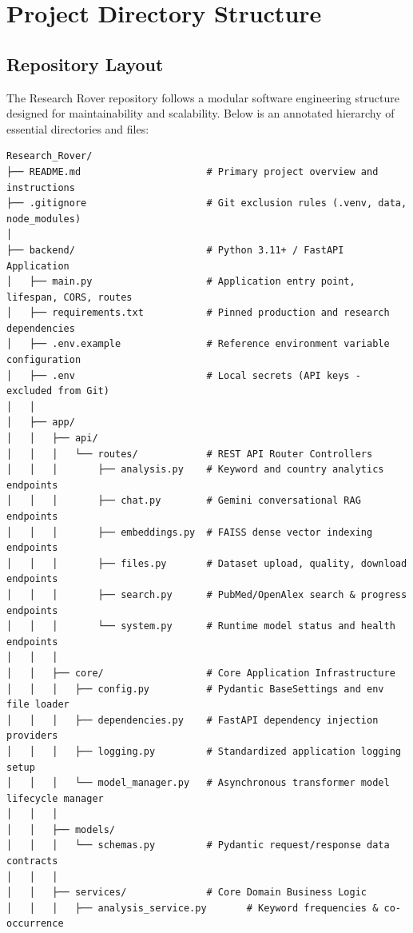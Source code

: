 \section{Project Directory Structure}
\label{sec:directory_structure}

\subsection{Repository Layout}
The Research Rover repository follows a modular software engineering structure designed for maintainability and scalability. Below is an annotated hierarchy of essential directories and files:

\begin{lstlisting}[caption={Annotated Research Rover Project Tree}]
Research_Rover/
├── README.md                      # Primary project overview and instructions
├── .gitignore                     # Git exclusion rules (.venv, data, node_modules)
│
├── backend/                       # Python 3.11+ / FastAPI Application
│   ├── main.py                    # Application entry point, lifespan, CORS, routes
│   ├── requirements.txt           # Pinned production and research dependencies
│   ├── .env.example               # Reference environment variable configuration
│   ├── .env                       # Local secrets (API keys - excluded from Git)
│   │
│   ├── app/
│   │   ├── api/
│   │   │   └── routes/            # REST API Router Controllers
│   │   │       ├── analysis.py    # Keyword and country analytics endpoints
│   │   │       ├── chat.py        # Gemini conversational RAG endpoints
│   │   │       ├── embeddings.py  # FAISS dense vector indexing endpoints
│   │   │       ├── files.py       # Dataset upload, quality, download endpoints
│   │   │       ├── search.py      # PubMed/OpenAlex search & progress endpoints
│   │   │       └── system.py      # Runtime model status and health endpoints
│   │   │
│   │   ├── core/                  # Core Application Infrastructure
│   │   │   ├── config.py          # Pydantic BaseSettings and env file loader
│   │   │   ├── dependencies.py    # FastAPI dependency injection providers
│   │   │   ├── logging.py         # Standardized application logging setup
│   │   │   └── model_manager.py   # Asynchronous transformer model lifecycle manager
│   │   │
│   │   ├── models/
│   │   │   └── schemas.py         # Pydantic request/response data contracts
│   │   │
│   │   ├── services/              # Core Domain Business Logic
│   │   │   ├── analysis_service.py       # Keyword frequencies & co-occurrence

\end{lstlisting}
